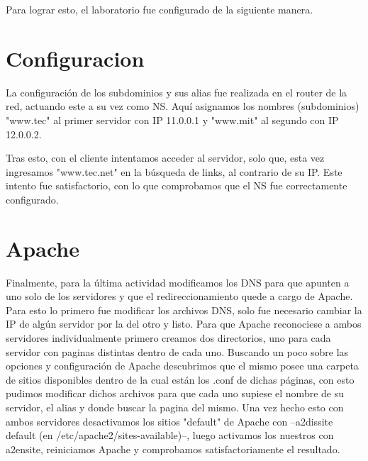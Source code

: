 \documentclass[12pt,a4paper]{article}
\begin{document}
	Para lograr esto, el laboratorio fue configurado de la siguiente manera.
	
	\section{Configuracion}
	La configuración de los subdominios y sus alias fue realizada en el router de la red, actuando este a su vez como NS. Aquí asignamos los nombres (subdominios)  "www.tec" al primer servidor con IP 11.0.0.1 y "www.mit" al segundo con IP 12.0.0.2.
	
	Tras esto, con el cliente intentamos acceder al servidor, solo que, esta vez ingresamos "www.tec.net" en la búsqueda de links, al contrario de su IP.
	Este intento fue satisfactorio, con lo que comprobamos que el NS fue correctamente configurado.
	
	
	\section{Apache}
	
	Finalmente, para la última actividad modificamos los DNS para que apunten a uno solo de los servidores y que el redireccionamiento quede a cargo de Apache.
	Para esto lo primero fue modificar los archivos DNS, solo fue necesario cambiar la IP de algún servidor por la del otro y listo.
	Para que Apache reconociese a ambos servidores individualmente primero creamos dos directorios, uno para cada servidor con paginas distintas dentro de cada uno.
	Buscando un poco sobre las opciones y configuración de Apache descubrimos que el mismo posee una carpeta de sitios disponibles dentro de la cual están los .conf de dichas páginas, con esto pudimos modificar dichos archivos para que cada uno supiese el nombre de su servidor, el alias y donde buscar la pagina del mismo.
	Una vez hecho esto con ambos servidores desactivamos los sitios "default" de Apache con --a2dissite default (en /etc/apache2/sites-available)--, luego activamos los nuestros con a2ensite, reiniciamos Apache y comprobamos satisfactoriamente el resultado. 
\end{document}
